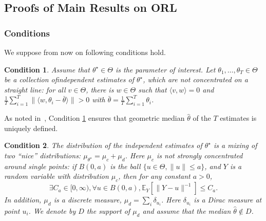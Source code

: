 \documentclass[11pt]{article}
\newtheorem{condition}{Condition}
\begin{document}
\subsection{Proofs of Main Results on ORL}
\subsubsection{Conditions}
We suppose from now on   following conditions hold.

\begin{condition}
	\label{cond1}
	Assume that $ \theta^\star \in \Theta $ is the parameter of interest. Let $ \theta_1,\ldots,\theta_T \in \Theta$ be a collection ofindependent estimates of $ \theta^\star $, which are not concentrated on a straight line: for all $ v \in \Theta $, there is $ w \in \Theta $ such that $ \langle v,w \rangle =0$ and $\frac{1}{T} \sum_{i=1}^T \|\langle w, \theta_i - \bar{\theta}\rangle \| > 0$ with $ \bar{\theta} = \frac{1}{T}\sum_{i=1}^T \theta_i $. %
\end{condition}
As noted in~\cite{cardot2013efficient},  Condition \ref{cond1} ensures that  geometric median $ \widehat{\theta} $ of the $ T $ estimates is uniquely defined.

\begin{condition}
	\label{cond2}
	The distribution of the independent estimates of $ \theta^\star $ is a mixing of two ``nice'' distributions: $ \mu_{\theta^\star} =  \mu_c + \mu_d $. Here $ \mu_c $ is not strongly concentrated around single points: if $ {B}(0,a) $ is the ball $ \{u \in \Theta, \|u\| \leq a \} $, and $ Y $ is a random variable with distribution $ \mu_c $, then for any constant $ a > 0 $,
	\begin{equation*}
	\exists C_a \in [0,\infty), \forall u \in {B}(0,a), \mathbb{E}_Y \left[\|Y-u\|^{-1}\right] \leq C_a.
	\end{equation*}
	In addition, $ \mu_d $ is a discrete measure, $ \mu_d = \sum_i  \delta_{u_i} $. Here $ \delta_{u_i} $ is a Dirac measure at point $ u_i $. We denote by $ D $ the support of $ \mu_d $ and assume that the median $ \widehat{\theta} \notin D $.
\end{condition}
\end{document}
